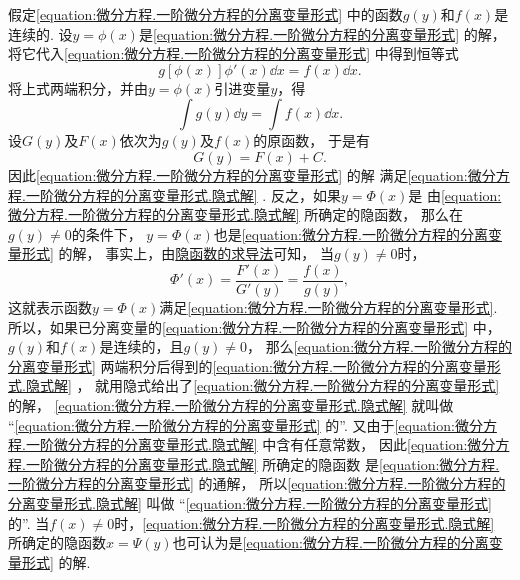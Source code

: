 假定\cref{equation:微分方程.一阶微分方程的分离变量形式} 中的函数\(g(y)\)和\(f(x)\)是连续的.
设\(y=\phi(x)\)是\cref{equation:微分方程.一阶微分方程的分离变量形式} 的解，
将它代入\cref{equation:微分方程.一阶微分方程的分离变量形式} 中得到恒等式\begin{equation*}
	g[\phi(x)] \phi'(x) \dd{x} = f(x) \dd{x}.
\end{equation*}
将上式两端积分，并由\(y=\phi(x)\)引进变量\(y\)，得\begin{equation*}
	\int g(y) \dd{y} = \int f(x) \dd{x}.
\end{equation*}
设\(G(y)\)及\(F(x)\)依次为\(g(y)\)及\(f(x)\)的原函数，
于是有\begin{equation}\label{equation:微分方程.一阶微分方程的分离变量形式.隐式解}
	G(y) = F(x) + C.
\end{equation}
因此\cref{equation:微分方程.一阶微分方程的分离变量形式} 的解
满足\cref{equation:微分方程.一阶微分方程的分离变量形式.隐式解} .
反之，如果\(y = \Phi(x)\)是
由\cref{equation:微分方程.一阶微分方程的分离变量形式.隐式解} 所确定的隐函数，
那么在\(g(y)\neq0\)的条件下，
\(y=\Phi(x)\)也是\cref{equation:微分方程.一阶微分方程的分离变量形式} 的解，
事实上，由\hyperref[theorem:多元函数微分法.隐函数存在定理1]{隐函数的求导法}可知，
当\(g(y)\neq0\)时，\begin{equation*}
	\Phi'(x) = \frac{F'(x)}{G'(y)} = \frac{f(x)}{g(y)},
\end{equation*}
这就表示函数\(y = \Phi(x)\)满足\cref{equation:微分方程.一阶微分方程的分离变量形式}.
所以，如果已分离变量的\cref{equation:微分方程.一阶微分方程的分离变量形式} 中，
\(g(y)\)和\(f(x)\)是连续的，且\(g(y)\neq0\)，
那么\cref{equation:微分方程.一阶微分方程的分离变量形式}
两端积分后得到的\cref{equation:微分方程.一阶微分方程的分离变量形式.隐式解} ，
就用隐式给出了\cref{equation:微分方程.一阶微分方程的分离变量形式} 的解，
\cref{equation:微分方程.一阶微分方程的分离变量形式.隐式解} 就叫做
“\cref{equation:微分方程.一阶微分方程的分离变量形式} 的”.
又由于\cref{equation:微分方程.一阶微分方程的分离变量形式.隐式解} 中含有任意常数，
因此\cref{equation:微分方程.一阶微分方程的分离变量形式.隐式解} 所确定的隐函数
是\cref{equation:微分方程.一阶微分方程的分离变量形式} 的通解，
所以\cref{equation:微分方程.一阶微分方程的分离变量形式.隐式解} 叫做
“\cref{equation:微分方程.一阶微分方程的分离变量形式} 的”.
当\(f(x)\neq0\)时，\cref{equation:微分方程.一阶微分方程的分离变量形式.隐式解}
所确定的隐函数\(x=\Psi(y)\)也可认为是\cref{equation:微分方程.一阶微分方程的分离变量形式} 的解.

